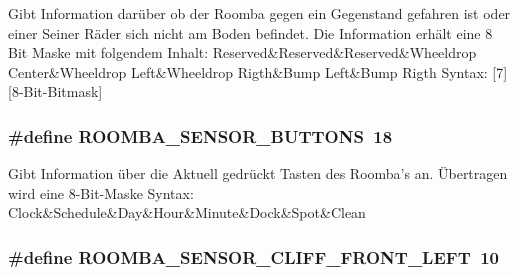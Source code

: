 Gibt Information darüber ob der Roomba gegen ein Gegenstand gefahren ist oder einer Seiner Räder sich nicht am Boden befindet. Die Information erhält eine 8 Bit Maske mit folgendem Inhalt\-: Reserved\&Reserved\&Reserved\&Wheeldrop Center\&Wheeldrop Left\&Wheeldrop Rigth\&Bump Left\&Bump Rigth Syntax\-: \mbox{[}7\mbox{]} \mbox{[}8-\/\-Bit-\/\-Bitmask\mbox{]} \hypertarget{group__roomba__sensor__extern_ga3fe82b1e1eacfd04e29a9ea7b5321ecb}{
\subsubsection[{R\-O\-O\-M\-B\-A\-\_\-\-S\-E\-N\-S\-O\-R\-\_\-\-B\-U\-T\-T\-O\-N\-S}]{\setlength{\rightskip}{0pt plus 5cm}\#define R\-O\-O\-M\-B\-A\-\_\-\-S\-E\-N\-S\-O\-R\-\_\-\-B\-U\-T\-T\-O\-N\-S~18}}\label{group__roomba__sensor__extern_ga3fe82b1e1eacfd04e29a9ea7b5321ecb}
Gibt Information über die Aktuell gedrückt Tasten des Roomba's an. Übertragen wird eine 8-\/\-Bit-\/\-Maske Syntax\-: Clock\&Schedule\&Day\&Hour\&Minute\&Dock\&Spot\&Clean \hypertarget{group__roomba__sensor__extern_ga81f46b587fc2bb45de93f8120dc400fc}{
\subsubsection[{R\-O\-O\-M\-B\-A\-\_\-\-S\-E\-N\-S\-O\-R\-\_\-\-C\-L\-I\-F\-F\-\_\-\-F\-R\-O\-N\-T\-\_\-\-L\-E\-F\-T}]{\setlength{\rightskip}{0pt plus 5cm}\#define R\-O\-O\-M\-B\-A\-\_\-\-S\-E\-N\-S\-O\-R\-\_\-\-C\-L\-I\-F\-F\-\_\-\-F\-R\-O\-N\-T\-\_\-\-L\-E\-F\-T~10}}\label{group__roomba__sensor__extern_ga81f46b587fc2bb45de93f8120dc400fc}
